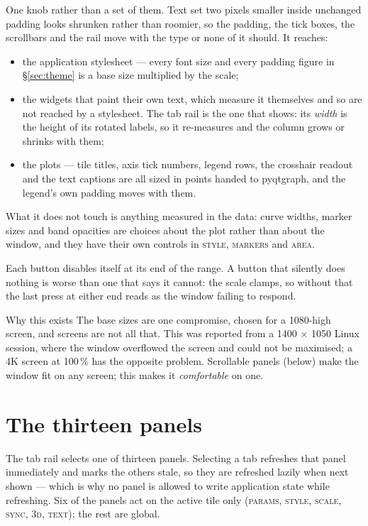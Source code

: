 \documentclass[11pt,a4paper,oneside]{report}
\newcommand{\tab}[1]{\textsc{#1}}
\begin{document}
One knob rather than a set of them. Text set two pixels smaller inside
unchanged padding looks shrunken rather than roomier, so the padding, the tick
boxes, the scrollbars and the rail move with the type or none of it should. It
reaches:

\begin{itemize}
\item the application stylesheet --- every font size and every padding figure
  in \S\ref{sec:theme} is a base size multiplied by the scale;
\item the widgets that paint their own text, which measure it themselves and
  so are not reached by a stylesheet. The tab rail is the one that shows: its
  \emph{width} is the height of its rotated labels, so it re-measures and the
  column grows or shrinks with them;
\item the plots --- tile titles, axis tick numbers, legend rows, the crosshair
  readout and the text captions are all sized in points handed to pyqtgraph,
  and the legend's own padding moves with them.
\end{itemize}

What it does not touch is anything measured in the data: curve widths, marker
sizes and band opacities are choices about the plot rather than about the
window, and they have their own controls in \tab{style}, \tab{markers} and
\tab{area}.

Each button disables itself at its end of the range. A button that silently
does nothing is worse than one that says it cannot: the scale clamps, so
without that the last press at either end reads as the window failing to
respond.

\begin{aoenote}{Why this exists}
The base sizes are one compromise, chosen for a 1080-high screen, and screens
are not all that. This was reported from a 1400 $\times$ 1050 Linux session,
where the window overflowed the screen and could not be maximised; a 4K screen
at 100\,\% has the opposite problem. Scrollable panels (below) make the window
fit on any screen; this makes it \emph{comfortable} on one.
\end{aoenote}

\chapter{The thirteen panels}

The tab rail selects one of thirteen panels. Selecting a tab refreshes that panel
immediately and marks the others stale, so they are refreshed lazily when next
shown --- which is why no panel is allowed to write application state while
refreshing. Six of the panels act on the active tile only (\tab{params},
\tab{style}, \tab{scale}, \tab{sync}, \tab{3d}, \tab{text}); the rest are
global.
\end{document}
